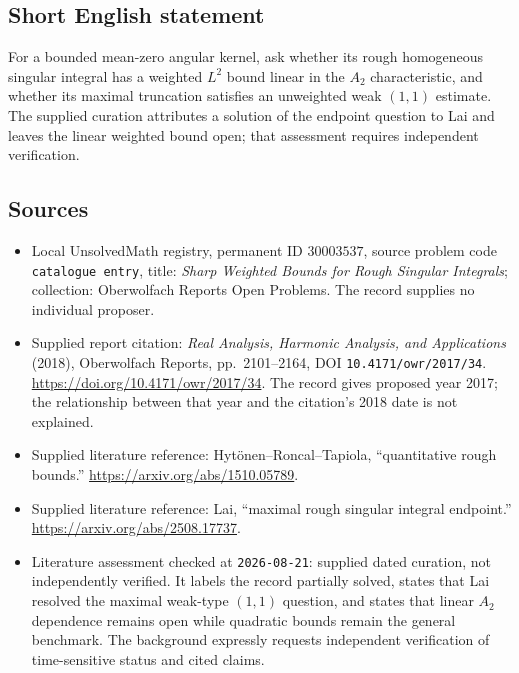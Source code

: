 \documentclass[11pt]{article}
\begin{document}
\subsection{Short English statement}
For a bounded mean-zero angular kernel, ask whether its rough homogeneous singular integral has a weighted \(L^2\) bound linear in the \(A_2\) characteristic, and whether its maximal truncation satisfies an unweighted weak \((1,1)\) estimate. The supplied curation attributes a solution of the endpoint question to Lai and leaves the linear weighted bound open; that assessment requires independent verification.
\subsection{Sources}
\begin{itemize}
\item Local UnsolvedMath registry, permanent ID \(30003537\), source problem code \texttt{catalogue entry}, title: \emph{Sharp Weighted Bounds for Rough Singular Integrals}; collection: Oberwolfach Reports Open Problems. The record supplies no individual proposer.
\item Supplied report citation: \emph{Real Analysis, Harmonic Analysis, and Applications} (2018), Oberwolfach Reports, pp.~2101--2164, DOI \texttt{10.4171/owr/2017/34}. \url{https://doi.org/10.4171/owr/2017/34}. The record gives proposed year 2017; the relationship between that year and the citation's 2018 date is not explained.
\item Supplied literature reference: Hyt\"onen--Roncal--Tapiola, ``quantitative rough bounds.'' \url{https://arxiv.org/abs/1510.05789}.
\item Supplied literature reference: Lai, ``maximal rough singular integral endpoint.'' \url{https://arxiv.org/abs/2508.17737}.
\item Literature assessment checked at \texttt{2026-08-21}: supplied dated curation, not independently verified. It labels the record partially solved, states that Lai resolved the maximal weak-type \((1,1)\) question, and states that linear \(A_2\) dependence remains open while quadratic bounds remain the general benchmark. The background expressly requests independent verification of time-sensitive status and cited claims.
\end{itemize}
\end{document}
